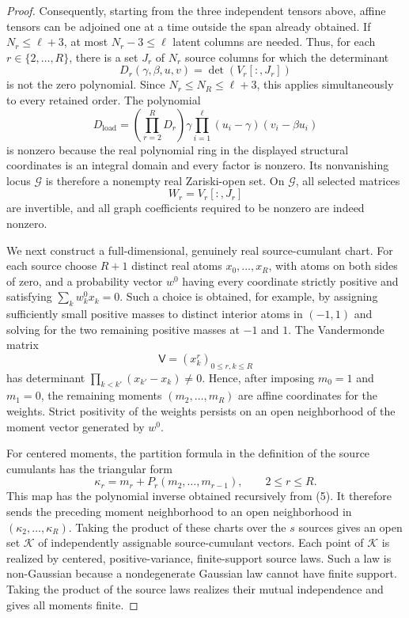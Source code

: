 \documentclass{article}
\begin{document}
\begin{proof}
Consequently, starting from the three independent tensors above, affine tensors can be adjoined one at a time outside the span already obtained.  If \(N_r\le \ell+3\), at most \(N_r-3\le\ell\) latent columns are needed.  Thus, for each \(r\in\{2,\ldots,R\}\), there is a set \(J_r\) of \(N_r\) source columns for which the determinant
\[
 D_r(\gamma,\beta,u,v)
 =\det\left(V_r[:,J_r]\right)
 \tag{2}
\]
is not the zero polynomial.  Since \(N_r\le N_R\le\ell+3\), this applies simultaneously to every retained order.  The polynomial
\[
 D_{\mathrm{load}}
 =\left(\prod_{r=2}^R D_r\right)
   \gamma\prod_{i=1}^{\ell}(u_i-\gamma)(v_i-\beta u_i)
 \tag{3}
\]
is nonzero because the real polynomial ring in the displayed structural coordinates is an integral domain and every factor is nonzero.  Its nonvanishing locus \(\mathcal G\) is therefore a nonempty real Zariski-open set.  On \(\mathcal G\), all selected matrices
\[
 W_r=V_r[:,J_r]
 \tag{4}
\]
are invertible, and all graph coefficients required to be nonzero are indeed nonzero.

We next construct a full-dimensional, genuinely real source-cumulant chart.  For each source choose \(R+1\) distinct real atoms \(x_0,\ldots,x_R\), with atoms on both sides of zero, and a probability vector \(w^0\) having every coordinate strictly positive and satisfying \(\sum_k w^0_kx_k=0\).  Such a choice is obtained, for example, by assigning sufficiently small positive masses to distinct interior atoms in \((-1,1)\) and solving for the two remaining positive masses at \(-1\) and \(1\).  The Vandermonde matrix
\[
 \mathsf V=(x_k^r)_{0\le r,k\le R}
\]
has determinant \(\prod_{k<k'}(x_{k'}-x_k)\ne0\).  Hence, after imposing \(m_0=1\) and \(m_1=0\), the remaining moments \((m_2,\ldots,m_R)\) are affine coordinates for the weights.  Strict positivity of the weights persists on an open neighborhood of the moment vector generated by \(w^0\).

For centered moments, the partition formula in the definition of the source cumulants has the triangular form
\[
 \kappa_r=m_r+P_r(m_2,\ldots,m_{r-1}),\qquad 2\le r\le R.
 \tag{5}
\]
This map has the polynomial inverse obtained recursively from (5).  It therefore sends the preceding moment neighborhood to an open neighborhood in \((\kappa_2,\ldots,\kappa_R)\).  Taking the product of these charts over the \(s\) sources gives an open set \(\mathcal K\) of independently assignable source-cumulant vectors.  Each point of \(\mathcal K\) is realized by centered, positive-variance, finite-support source laws.  Such a law is non-Gaussian because a nondegenerate Gaussian law cannot have finite support.  Taking the product of the source laws realizes their mutual independence and gives all moments finite.


\end{proof}
\end{document}

